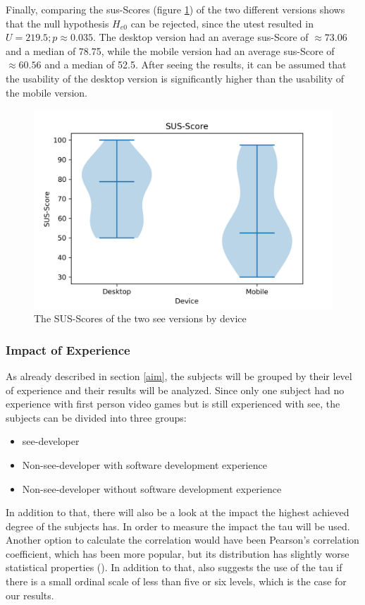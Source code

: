Finally, comparing the \gls{sus}-Scores (figure \ref{fig:sus-vio}) of the two different versions shows that the null hypothesis $H_{e0}$ can be rejected, since the \gls{utest} resulted in $U = 219.5; p \approx 0.035$.
The desktop version had an average \gls{sus}-Score of $\approx 73.06$ and a median of 78.75, while the mobile version had an average \gls{sus}-Score of $\approx 60.56$ and a median of 52.5. 
After seeing the results, it can be assumed that the \gls{usability} of the desktop version is significantly higher than the \gls{usability} of the mobile version.
\begin{figure}[htb]
  \centering
  \includegraphics[width=1\textwidth]{Evaluation/img/SUS-Score_violin.png}
  \caption{The SUS-Scores of the two \gls{see} versions by device}\label{fig:sus-vio}
\end{figure}

\subsubsection{Impact of Experience}
\label{sec:experinece}
As already described in section \ref{aim}, the subjects will be grouped by their level of experience and their results will be analyzed.
Since only one subject had no experience with first person video games but is still experienced with \gls{see}, the subjects can be divided into three groups: 
\begin{itemize}
  \item \gls{see}-developer
  \item Non-\gls{see}-developer with software development experience
  \item Non-\gls{see}-developer without software development experience
\end{itemize}
In addition to that, there will also be a look at the impact the highest achieved degree of the subjects has.
In order to measure the impact the \gls{tau} will be used.
Another option to calculate the correlation would have been Pearson’s correlation coefficient, which has been more popular, but its distribution has slightly worse statistical properties (\cite{hauke2011comparison}).
In addition to that, \cite{khamis2008measures} also suggests the use of the \gls{tau} if there is a small ordinal scale of less than five or six levels, which is the case for our results.

